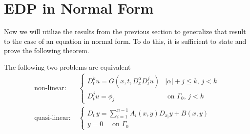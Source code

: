 \newpage
\section{EDP in Normal Form}
Now we will utilize the results from the previous section to generalize that result to the case of an equation in normal form. To do this, it is sufficient to state and prove the following theorem.
\begin{theorem}\label{teonorm}
The following two problems are equivalent
\begin{align*}
\text{non-linear: }&
\begin{cases}
D_{t}^k u = G(x,t, D^\alpha_x D^j_t u) & |\alpha |+ j \leq k, \, j<k \\ 
D_t^ju = \phi_j & \text{ on } \Gamma_0, \, j<k 
\end{cases} \\ 
\text{quasi-linear: }&
\begin{cases}
D_t \, y = \sum\limits_{i=1}^{n-1} A_i(x,y)D_{x_i}y+B(x,y) \; \\ 
y=0 \quad \text{ on } \Gamma_0 
\end{cases}
\end{align*}
\end{theorem}

